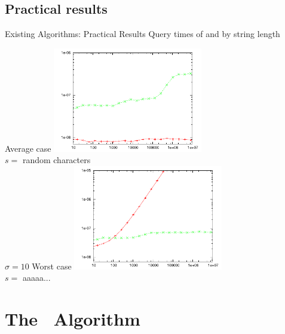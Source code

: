 \documentclass{beamer}
\begin{document}
\subsection{Practical results}
\begin{frame}{Existing Algorithms: Practical Results}
    Query times of
    \textcolor{red}{} and
    \textcolor{green}{}
    by string length
    \begin{multicols}{2}{
        \begin{center}
            Average case
            \includegraphics[width=0.49\textwidth,type=pdf,ext=.pdf,read=.pdf]{../src/results/length-rmq-directcomp-slide-rand10.plt}\\
            $s=$ random characters\\ $\sigma=10$
            \newpage
            Worst case
            \includegraphics[width=0.49\textwidth,type=pdf,ext=.pdf,read=.pdf]{../src/results/length-rmq-directcomp-slide-alla.plt}\\
            $s=$ aaaaa...
        \end{center}
    }
    \end{multicols}

\end{frame}

\section{The \fprintk\ Algorithm}
\end{document}
